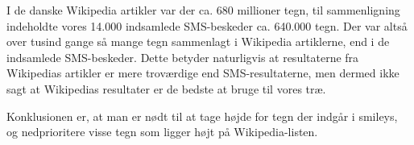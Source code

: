 I de danske Wikipedia artikler var der ca. 680 millioner tegn, til sammenligning indeholdte vores 14.000 indsamlede SMS-beskeder ca. 640.000 tegn. Der var altså over tusind gange så mange tegn sammenlagt i Wikipedia artiklerne, end i de indsamlede SMS-beskeder. Dette betyder naturligvis at resultaterne fra Wikipedias artikler er mere troværdige end SMS-resultaterne, men dermed ikke sagt at Wikipedias resultater er de bedste at bruge til vores træ.

Konklusionen er, at man er nødt til at tage højde for tegn der indgår i smileys, og nedprioritere visse tegn som ligger højt på Wikipedia-listen.
  
